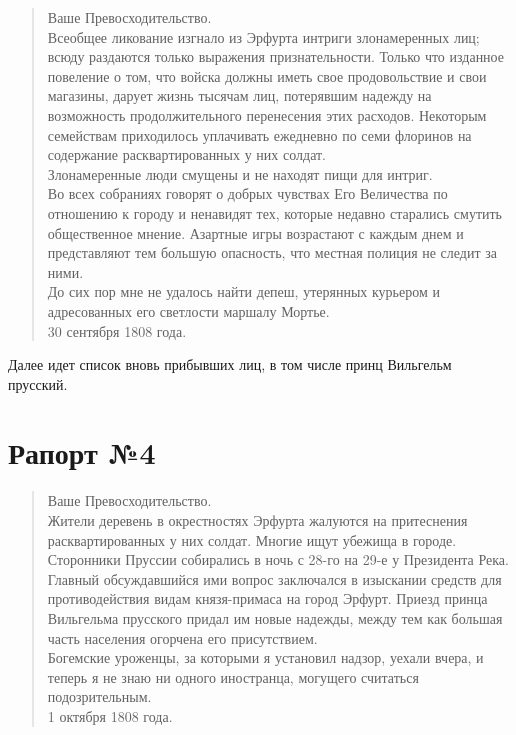 \documentclass[
  oneside,
  12pt,
  titlepage]{book}
\begin{document}
\begin{quote}
Ваше Превосходительство.\\
Всеобщее ликование изгнало из Эрфурта интриги злонамеренных лиц; всюду раздаются только выражения признательности. Только что изданное повеление о том, что войска должны иметь свое продовольствие и свои магазины, дарует жизнь тысячам лиц, потерявшим надежду на возможность продолжительного перенесения этих расходов. Некоторым семействам приходилось уплачивать ежедневно по семи флоринов на содержание расквартированных у них солдат.\\
Злонамеренные люди смущены и не находят пищи для интриг.\\
Во всех собраниях говорят о добрых чувствах Его Величества по отношению к городу и ненавидят тех, которые недавно старались смутить общественное мнение. Азартные игры возрастают с каждым днем и представляют тем большую опасность, что местная полиция не следит за ними.\\
До сих пор мне не удалось найти депеш, утерянных курьером и адресованных его светлости маршалу Мортье.\\
30 сентября 1808 года.
\end{quote}

Далее идет список вновь прибывших лиц, в том числе принц Вильгельм прусский.

\hypertarget{ux440ux430ux43fux43eux440ux442-4}{%
\section{Рапорт №4}\label{ux440ux430ux43fux43eux440ux442-4}}

\begin{quote}
Ваше Превосходительство.\\
Жители деревень в окрестностях Эрфурта жалуются на притеснения расквартированных у них солдат. Многие ищут убежища в городе.\\
Сторонники Пруссии собирались в ночь с 28-го на 29-е у Президента Река. Главный обсуждавшийся ими вопрос заключался в изыскании средств для противодействия видам князя-примаса на город Эрфурт. Приезд принца Вильгельма прусского придал им новые надежды, между тем как большая часть населения огорчена его присутствием.\\
Богемские уроженцы, за которыми я установил надзор, уехали вчера, и теперь я не знаю ни одного иностранца, могущего считаться подозрительным.\\
1 октября 1808 года.
\end{quote}
\end{document}
